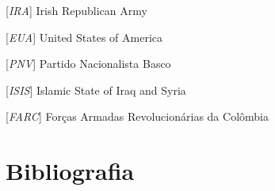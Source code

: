 \documentclass{report}
\begin{document}
\begin{acronym}
[\textit{IRA}] {Irish Republican Army}
\end{acronym}


\begin{acronym}
[\textit{EUA}] {United States of America}
\end{acronym}


\begin{acronym}
[\textit{PNV}] {Partido Nacionalista Basco}
\end{acronym}


\begin{acronym}
[\textit{ISIS}] {Islamic State of Iraq and Syria}
\end{acronym}


\begin{acronym}
[\textit{FARC}] {Forças Armadas Revolucionárias da Colômbia}
\end{acronym}


\printbibliography
\chapter*{Bibliografia}
\end{document}
